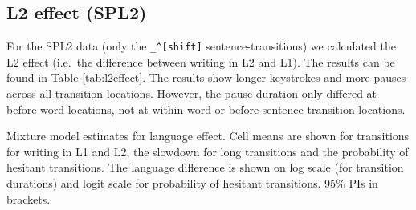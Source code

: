 \documentclass[
  english,
  man,floatsintext]{apa7}
\begin{document}
\clearpage
\makeatletter
\efloat@restorefloats
\makeatother


\begin{appendix}
\section{}
\hypertarget{l2-effect-spl2}{%
\subsection{L2 effect (SPL2)}\label{l2-effect-spl2}}

For the SPL2 data (only the \texttt{\_\^{}{[}shift{]}}
sentence-transitions) we calculated the L2 effect (i.e.~the difference
between writing in L2 and L1). The results can be found in Table
\ref{tab:l2effect}. The results show longer keystrokes and more pauses
across all transition locations. However, the pause duration only
differed at before-word locations, not at within-word or before-sentence
transition locations.

\begin{table}[tbp]

\begin{center}
\begin{threeparttable}

\caption{\label{tab:l2effect}Mixture model estimates for language effect. Cell means are shown for transitions for writing in L1 and L2, the slowdown for long transitions and the probability of hesitant transitions. The language difference is shown on log scale (for transition durations) and logit scale for probability of hesitant transitions. 95\% PIs in brackets.}

\small{

}
\end{threeparttable}
\end{center}
\end{table}
\end{appendix}
\end{document}
